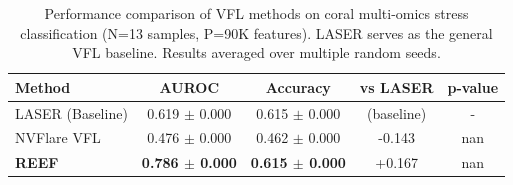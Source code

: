 
\begin{table}[h]
\centering
\caption{Performance comparison of VFL methods on coral multi-omics stress classification (N=13 samples, P=90K features). LASER serves as the general VFL baseline. Results averaged over multiple random seeds.}
\label{tab:vfl_comparison}
\begin{tabular}{lcccc}
\toprule
\textbf{Method} & \textbf{AUROC} & \textbf{Accuracy} & \textbf{vs LASER} & \textbf{p-value} \\
\midrule
LASER (Baseline) & 0.619 $\pm$ 0.000 & 0.615 $\pm$ 0.000 & (baseline) & - \\
NVFlare VFL & 0.476 $\pm$ 0.000 & 0.462 $\pm$ 0.000 & -0.143 & nan \\
\textbf{REEF} & \textbf{0.786 $\pm$ 0.000} & \textbf{0.615 $\pm$ 0.000} & +0.167 & nan \\

\bottomrule
\end{tabular}
\end{table}
